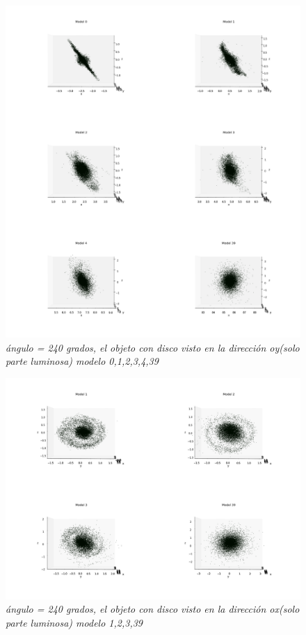 \documentclass[12pt]{article} %
\renewcommand{\=}[1]{\stackrel{#1}{=}} %
\theoremstyle{definition}
\theoremstyle{remark}
\begin{document}
\begin{figure}[!ht]
 \centering
 \includegraphics[scale=0.2]{240deg-m-c2y.png}
 \caption{\emph{ ángulo = 240 grados, el objeto con disco visto en la dirección oy(solo parte luminosa) modelo 0,1,2,3,4,39 }}
\end{figure}

\clearpage


\begin{figure}[!ht]
 \centering
 \includegraphics[scale=0.2]{240deg-m-c2.png}
 \caption{\emph{ ángulo = 240 grados, el objeto con disco visto en la dirección ox(solo parte luminosa) modelo 1,2,3,39 }}
\end{figure}
\end{document}
